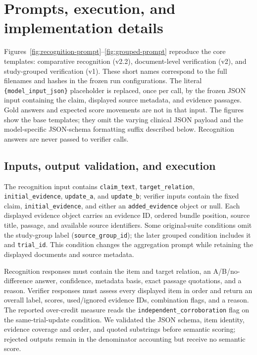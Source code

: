 \documentclass[11pt]{article}
\begin{document}
\section{Prompts, execution, and implementation details}
\label{app:prompt-contract}

Figures~\ref{fig:recognition-prompt}--\ref{fig:grouped-prompt} reproduce the core templates: comparative recognition (v2.2), document-level verification (v2), and study-grouped verification (v1). These short names correspond to the full filenames and hashes in the frozen run configurations. The literal \texttt{\{model\_input\_json\}} placeholder is replaced, once per call, by the frozen JSON input containing the claim, displayed source metadata, and evidence passages. Gold answers and expected score movements are not in that input. The figures show the base templates; they omit the varying clinical JSON payload and the model-specific JSON-schema formatting suffix described below. Recognition answers are never passed to verifier calls.

\subsection{Inputs, output validation, and execution}
\label{app:prompt-execution}

The recognition input contains \texttt{claim\_text}, \texttt{target\_relation}, \texttt{initial\_evidence}, \texttt{update\_a}, and \texttt{update\_b}; verifier inputs contain the fixed claim, \texttt{initial\_evidence}, and either an \texttt{added\_evidence} object or null. Each displayed evidence object carries an evidence ID, ordered bundle position, source title, passage, and available source identifiers. Some original-suite conditions omit the study-group label (\texttt{source\_group\_id}); the later grouped condition includes it and \texttt{trial\_id}. This condition changes the aggregation prompt while retaining the displayed documents and source metadata.

Recognition responses must contain the item and target relation, an A/B/no-difference answer, confidence, metadata basis, exact passage quotations, and a reason. Verifier responses must assess every displayed item in order and return an overall label, scores, used/ignored evidence IDs, combination flags, and a reason. The reported over-credit measure reads the \texttt{independent\_corroboration} flag on the same-trial-update condition. We validated the JSON schema, item identity, evidence coverage and order, and quoted substrings before semantic scoring; rejected outputs remain in the denominator accounting but receive no semantic score.
\end{document}
